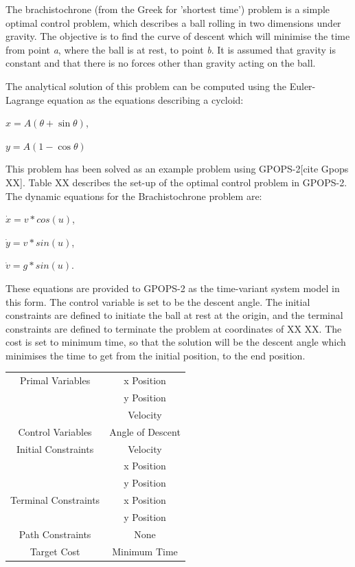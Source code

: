 The brachistochrone (from the Greek for 'shortest time') problem is a simple optimal control problem, which describes a ball rolling in two dimensions under gravity. The objective is to find the curve of descent which will minimise the time from point \textit{a}, where the ball is at rest, to point \textit{b}. It is assumed that gravity is constant and that there is no forces other than gravity acting on the ball. 

The analytical solution of this problem can be computed using the Euler-Lagrange equation as the equations describing a cycloid:

$x = A(\theta + \sin\theta) $,

$y=A(1 - \cos\theta)$

This problem has been solved as an example problem using GPOPS-2[cite Gpops XX]. Table XX describes the set-up of the optimal control problem in GPOPS-2. The dynamic equations for the Brachistochrone problem are:

$\dot{x} = v*cos(u)$,

$\dot{y} = v*sin(u)$,

$\dot{v} = g*sin(u)$.

\noindent These equations are provided to GPOPS-2 as the time-variant system model in this form. The control variable is set to be the descent angle. The initial constraints are defined to initiate the ball at rest at the origin, and the terminal constraints are defined to terminate the problem at coordinates of XX XX. The cost is set to minimum time, so that the solution will be the descent angle which minimises the time to get from the initial position, to the end position. 

\begin{table}
\centering
\begin{tabular}{|c|c|}
	\hline Primal Variables  & x Position\\& y Position\\& Velocity\\ 
	\hline Control Variables  & Angle of Descent\\ 
	\hline Initial Constraints  & Velocity\\ & x Position\\ & y Position\\
	\hline Terminal Constraints &  x Position\\ & y Position\\
	\hline Path Constraints & None \\ 
	\hline Target Cost & Minimum Time \\ 
	\hline 
\end{tabular} 
\end{table}


